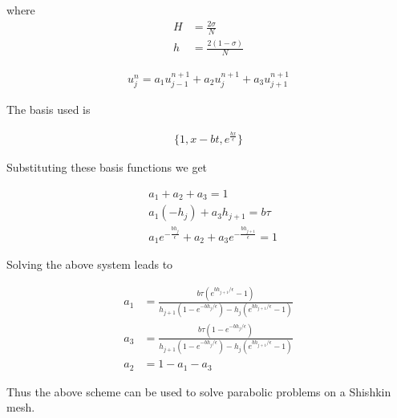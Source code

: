 where
\begin{align*}
 H &= \frac{2 \sigma}{N}\\
 h &= \frac{2(1-\sigma)}{N}
\end{align*}

\begin{align*}
 u_{j}^{n} = a_{1}u_{j-1}^{n+1} + a_{2}u_{j}^{n+1} + a_{3}u_{j+1}^{n+1}
\end{align*}

The basis used is

\begin{align*}
 \{ 1, x-bt, e^{\frac{bx}{\epsilon}} \}
\end{align*}

Substituting these basis functions we get

\begin{align*}
 &a_{1}+a_{2}+a_{3} = 1\\
 &a_{1}(-h_{j})+a_{3}h_{j+1} = b \tau\\
 &a_{1}e^{-\frac{bh_{j}}{\epsilon}}+a_{2}+a_{3}e^{-\frac{bh_{j+1}}{\epsilon}} = 1
\end{align*}

Solving the above system leads to

\begin{align*}
 a_{1} &= \frac{b \tau (e^{bh_{j+1}/\epsilon}-1)}{h_{j+1}(1-e^{-bh_{j}/\epsilon}) - h_{j}(e^{bh_{j+1}/\epsilon}-1)}\\
 a_{3} &= \frac{b \tau (1-e^{-bh_{j}/\epsilon})}{h_{j+1}(1-e^{-bh_{j}/\epsilon}) - h_{j}(e^{bh_{j+1}/\epsilon}-1)}\\
 a_{2} &= 1-a_1-a_3
\end{align*}

Thus the above scheme can be used to solve parabolic problems on a Shishkin mesh.
